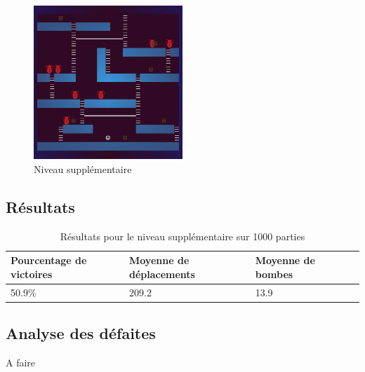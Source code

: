 \begin{figure}[!htpb]
    \centering
    \includegraphics[width=0.5\textwidth]{Figures/level4.png}
    \caption{Niveau supplémentaire}
    \label{fig:niveau-supplementaire}
\end{figure}

\newpage

\subsection{Résultats}

\begin{table}[!htpb]
    \begin{tabularx}{\textwidth}{lXXX}
        \toprule
        Pourcentage de victoires & Moyenne de déplacements & Moyenne de bombes \\
        \midrule
        50.9\% & 209.2 & 13.9 \\
        \bottomrule
    \end{tabularx}
    \caption{Résultats pour le niveau supplémentaire sur 1000 parties}
    \label{tab:res-niveau-supplementaire}
\end{table}

\subsection{Analyse des défaites}

A faire